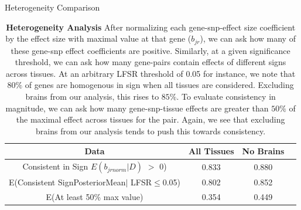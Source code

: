 \begin{table}[htbp]
\caption{Heterogeneity Comparison}
\centering
\begin{tabular}{c c c c}
\hline\hline
Data & All Tissues  & No Brains  \\ [0.5ex] %
\hline
Consistent in Sign $E(b_{jrnorm}|D)$ $>$ 0) &0.833&0.880 \\
E(Consistent SignPosteriorMean$\mid$ LFSR$\leq$0.05)&0.802&0.852\\
E(At least 50\% max value) &0.354&0.449\\
\hline
\end{tabular}
\label{table:het}
\caption{\textbf{Heterogeneity Analysis} After normalizing each gene-snp-effect size coefficient by the effect size with maximal value at that gene ($b_{jr}$), we can ask how many of these gene-snp effect coefficients are positive. Similarly, at a given significance threshold, we can ask how many gene-pairs contain effects of different signs across tissues. At an arbitrary LFSR threshold of 0.05 for instance, we note that $80\%$ of genes are homogenous in sign when all tissues are considered. Excluding brains from our analysis, this rises to $85\%$. To evaluate consistency in magnitude, we can ask how many gene-snp-tissue effects are greater than $50\%$ of the maximal effect across tissues for the pair. Again, we see that excluding brains from our analysis tends to push this towards consistency.}
\end{table} \newline




